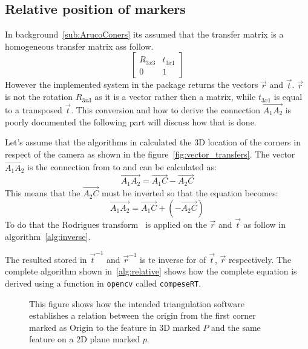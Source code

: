 \subsection{Relative position of \aruco markers}%
\label{sub:implement:relative}
In background~\ref{sub:ArucoConers} its assumed that the transfer matrix is a homogeneous transfer matrix ass follow.
\begin{equation}
    \begin{bmatrix}
        R_{3x3} & t_{3x1}\\
        0 & 1
    \end{bmatrix}
\end{equation}
However the implemented system in the \aruco{} package returns the vectors $\vec{r}$ and $\vec{t}$.
$\vec{r}$ is not the rotation $R_{3x3}$ as it is a vector rather then a matrix, while $t_{3x1}$ is equal to a transposed $\vec{t}$.
This conversion and how to derive the connection $\vec{A_1A_2}$ is poorly documented the following part will discuss how that is done.
\par
Let's assume that the algorithms in \aruco calculated the 3D location of the corners in respect of the camera as shown in the  figure~\ref{fig:vector_transfers}.
The vector $\vec{A_1A_2}$ is the connection from  to  and can be calculated as:
\[
\vec{A_1A_2} = \vec{A_1C} - \vec{A_2C}
\]
This means that the $\vec{A_2C}$ must be inverted so that the equation becomes:
\[
\vec{A_1A_2} = \vec{A_1C} + (-\vec{A_2C})
\]
To do that the Rodrigues transform~\cite{rodriguez1840lois} is applied on the $\vec{r}$ and $\vec{t}$ as follow in algorithm~\ref{alg:inverse}.

The resulted stored in $\vec{t}^{-1}$ and $\vec{r}^{-1}$ is te inverse for of $\vec{t}$, $\vec{r}$ respectively.
The complete algorithm shown in~\ref{alg:relative} shows how the complete equation is derived using a function in \verb|opencv| called \verb|compeseRT|.
% 





\begin{figure}[ht]
    \begin{center}
        
    \end{center}
    \caption[Triangulations]{ This figure shows how the intended triangulation software establishes a relation between the origin from the first \aruco corner marked as Origin
        to the feature in 3D marked $P$ and the same feature on a 2D plane marked $p$.}
    \label{fig:camera_transfer}
\end{figure}


